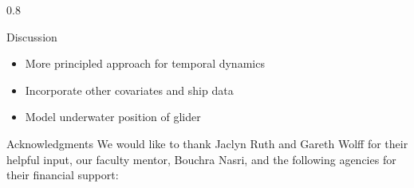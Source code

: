 \documentclass[final]{beamer}
\newlength{\colwidth}
\begin{document}
\begin{frame}[t]
\begin{columns}[t]
\begin{column}{0.8\colwidth}
\begin{block}{Discussion}
\vspace{-25pt}

    \vspace{-25pt}
    \begin{itemize}
        \item More principled approach for temporal dynamics
        \item Incorporate other covariates and ship data
        \item Model underwater position of glider
    \end{itemize}
\end{block}

\vspace{-30pt}

\begin{block}{Acknowledgments}
      We would like to thank Jaclyn Ruth and Gareth Wolff for their helpful input, our faculty mentor, Bouchra Nasri, and the following agencies for their financial support:  
    

\end{block}
\end{column}
\end{columns}
\end{frame}
\end{document}
